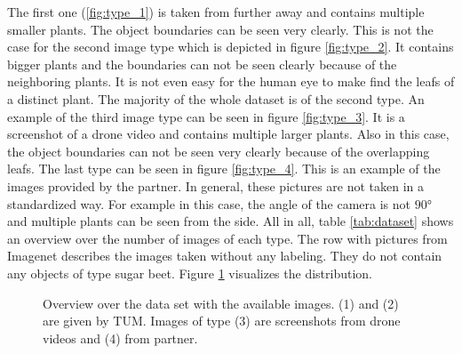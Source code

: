 The first one (\ref{fig:type_1}) is taken from further away and contains multiple smaller plants. The object boundaries can be seen very clearly. This is not the case for the second image type which is depicted in figure \ref{fig:type_2}. It contains bigger plants and the boundaries can not be seen clearly because of the neighboring plants. It is not even easy for the human eye to make find the leafs of a distinct plant. The majority of the whole dataset is of the second type. An example of the third image type can be seen in figure \ref{fig:type_3}. It is a screenshot of a drone video and contains multiple larger plants. Also in this case, the object boundaries can not be seen very clearly because of the overlapping leafs. The last type can be seen in figure \ref{fig:type_4}. This is an example of the images provided by the partner. In general, these pictures are not taken in a standardized way. For example in this case, the angle of the camera is not $ 90° $ and multiple plants can be seen from the side. All in all, table \ref{tab:dataset} shows an overview over the number of images of each type. The row with pictures from Imagenet describes the images taken without any labeling. They do not contain any objects of type sugar beet. Figure \ref{fig:bar_chart} visualizes the distribution. \\

\begin{figure}
	\centering
{}
\caption{Overview over the data set with the available images. (1) and (2) are given by TUM. Images of type (3) are screenshots from drone videos and (4) from partner.}
\label{fig:bar_chart}
\end{figure}


